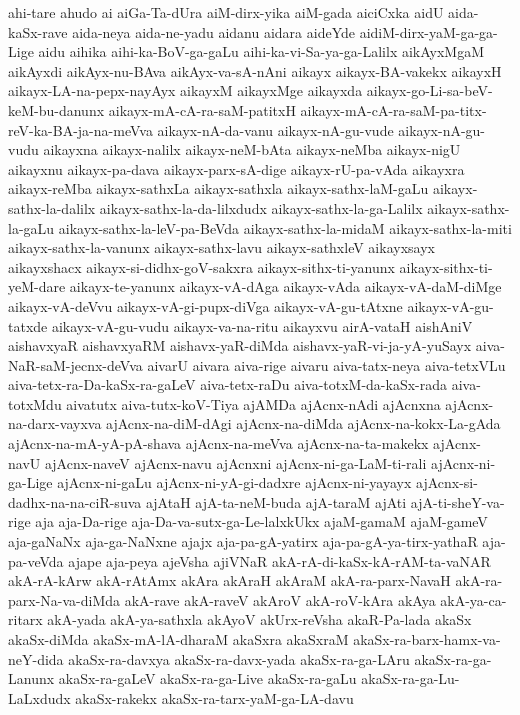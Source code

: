 {ahi-tare
ahudo
ai
aiGa-Ta-dUra
aiM-dirx-yika
aiM-gada
aiciCxka
aidU
aida-kaSx-rave
aida-neya
aida-ne-yadu
aidanu
aidara
aideYde
aidiM-dirx-yaM-ga-ga-Lige
aidu
aihika
aihi-ka-BoV-ga-gaLu
aihi-ka-vi-Sa-ya-ga-Lalilx
aikAyxMgaM
aikAyxdi
aikAyx-nu-BAva
aikAyx-va-sA-nAni
aikayx
aikayx-BA-vakekx
aikayxH
aikayx-LA-na-pepx-nayAyx
aikayxM
aikayxMge
aikayxda
aikayx-go-Li-sa-beV-keM-bu-danunx
aikayx-mA-cA-ra-saM-patitxH
aikayx-mA-cA-ra-saM-pa-titx-reV-ka-BA-ja-na-meVva
aikayx-nA-da-vanu
aikayx-nA-gu-vude
aikayx-nA-gu-vudu
aikayxna
aikayx-nalilx
aikayx-neM-bAta
aikayx-neMba
aikayx-nigU
aikayxnu
aikayx-pa-dava
aikayx-parx-sA-dige
aikayx-rU-pa-vAda
aikayxra
aikayx-reMba
aikayx-sathxLa
aikayx-sathxla
aikayx-sathx-laM-gaLu
aikayx-sathx-la-dalilx
aikayx-sathx-la-da-lilxdudx
aikayx-sathx-la-ga-Lalilx
aikayx-sathx-la-gaLu
aikayx-sathx-la-leV-pa-BeVda
aikayx-sathx-la-midaM
aikayx-sathx-la-miti
aikayx-sathx-la-vanunx
aikayx-sathx-lavu
aikayx-sathxleV
aikayxsayx
aikayxshacx
aikayx-si-didhx-goV-sakxra
aikayx-sithx-ti-yanunx
aikayx-sithx-ti-yeM-dare
aikayx-te-yanunx
aikayx-vA-dAga
aikayx-vAda
aikayx-vA-daM-diMge
aikayx-vA-deVvu
aikayx-vA-gi-pupx-diVga
aikayx-vA-gu-tAtxne
aikayx-vA-gu-tatxde
aikayx-vA-gu-vudu
aikayx-va-na-ritu
aikayxvu
airA-vataH
aishAniV
aishavxyaR
aishavxyaRM
aishavx-yaR-diMda
aishavx-yaR-vi-ja-yA-yuSayx
aiva-NaR-saM-jecnx-deVva
aivarU
aivara
aiva-rige
aivaru
aiva-tatx-neya
aiva-tetxVLu
aiva-tetx-ra-Da-kaSx-ra-gaLeV
aiva-tetx-raDu
aiva-totxM-da-kaSx-rada
aiva-totxMdu
aivatutx
aiva-tutx-koV-Tiya
ajAMDa
ajAcnx-nAdi
ajAcnxna
ajAcnx-na-darx-vayxva
ajAcnx-na-diM-dAgi
ajAcnx-na-diMda
ajAcnx-na-kokx-La-gAda
ajAcnx-na-mA-yA-pA-shava
ajAcnx-na-meVva
ajAcnx-na-ta-makekx
ajAcnx-navU
ajAcnx-naveV
ajAcnx-navu
ajAcnxni
ajAcnx-ni-ga-LaM-ti-rali
ajAcnx-ni-ga-Lige
ajAcnx-ni-gaLu
ajAcnx-ni-yA-gi-dadxre
ajAcnx-ni-yayayx
ajAcnx-si-dadhx-na-na-ciR-suva
ajAtaH
ajA-ta-neM-buda
ajA-taraM
ajAti
ajA-ti-sheY-va-rige
aja
aja-Da-rige
aja-Da-va-sutx-ga-Le-lalxkUkx
ajaM-gamaM
ajaM-gameV
aja-gaNaNx
aja-ga-NaNxne
ajajx
aja-pa-gA-yatirx
aja-pa-gA-ya-tirx-yathaR
aja-pa-veVda
ajape
aja-peya
ajeVsha
ajiVNaR
akA-rA-di-kaSx-kA-rAM-ta-vaNAR
akA-rA-kArw
akA-rAtAmx
akAra
akAraH
akAraM
akA-ra-parx-NavaH
akA-ra-parx-Na-va-diMda
akA-rave
akA-raveV
akAroV
akA-roV-kAra
akAya
akA-ya-ca-ritarx
akA-yada
akA-ya-sathxla
akAyoV
akUrx-reVsha
akaR-Pa-lada
akaSx
akaSx-diMda
akaSx-mA-lA-dharaM
akaSxra
akaSxraM
akaSx-ra-barx-hamx-va-neY-dida
akaSx-ra-davxya
akaSx-ra-davx-yada
akaSx-ra-ga-LAru
akaSx-ra-ga-Lanunx
akaSx-ra-gaLeV
akaSx-ra-ga-Live
akaSx-ra-gaLu
akaSx-ra-ga-Lu-LaLxdudx
akaSx-rakekx
akaSx-ra-tarx-yaM-ga-LA-davu
}
